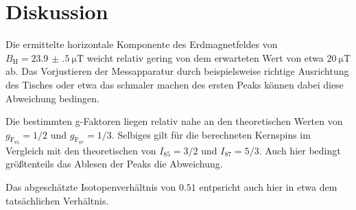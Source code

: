 \section{Diskussion}
\label{sec:Diskussion}

Die ermittelte horizontale Komponente des Erdmagnetfeldes von $B_\text{H} = \qty{23.9(5)}{\micro\tesla}$
weicht relativ gering von dem erwarteten Wert von etwa $\qty{20}{\micro\tesla}$ ab.
Das Vorjustieren der Messapparatur durch beispielsweise richtige Ausrichtung des Tisches oder
etwa das schmaler machen des ersten Peaks können dabei diese Abweichung bedingen.

Die bestimmten g-Faktoren liegen relativ nahe an den theoretischen Werten von
$g_{\text{F}_{85}}= 1/2$ und $g_{\text{F}_{87}}= 1/3$. 
Selbiges gilt für die berechneten Kernspins im Vergleich mit den theoretischen von
$I_{85}=3/2$ und $I_{87}=5/3$.
Auch hier bedingt größtenteils das Ablesen der Peaks die Abweichung.

Das abgeschätzte Isotopenverhältnis von $0.51$ entpsricht auch hier in etwa dem tatsächlichen Verhältnis.
